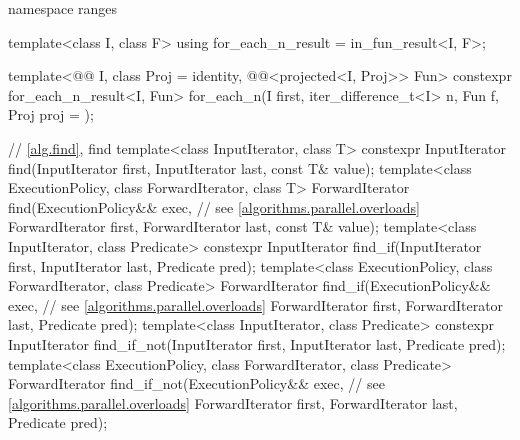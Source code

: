 \begin{codeblock}
{  namespace ranges {
    template<class I, class F>
      using for_each_n_result = in_fun_result<I, F>;

    template<@@ I, class Proj = identity,
             @@<projected<I, Proj>> Fun>
      constexpr for_each_n_result<I, Fun>
        for_each_n(I first, iter_difference_t<I> n, Fun f, Proj proj = {});
  }

  // \ref{alg.find}, find
  template<class InputIterator, class T>
    constexpr InputIterator find(InputIterator first, InputIterator last,
                                 const T& value);
  template<class ExecutionPolicy, class ForwardIterator, class T>
    ForwardIterator find(ExecutionPolicy&& exec,                // see \ref{algorithms.parallel.overloads}
                         ForwardIterator first, ForwardIterator last,
                         const T& value);
  template<class InputIterator, class Predicate>
    constexpr InputIterator find_if(InputIterator first, InputIterator last,
                                    Predicate pred);
  template<class ExecutionPolicy, class ForwardIterator, class Predicate>
    ForwardIterator find_if(ExecutionPolicy&& exec,             // see \ref{algorithms.parallel.overloads}
                            ForwardIterator first, ForwardIterator last,
                            Predicate pred);
  template<class InputIterator, class Predicate>
    constexpr InputIterator find_if_not(InputIterator first, InputIterator last,
                                        Predicate pred);
  template<class ExecutionPolicy, class ForwardIterator, class Predicate>
    ForwardIterator find_if_not(ExecutionPolicy&& exec,         // see \ref{algorithms.parallel.overloads}
                                ForwardIterator first, ForwardIterator last,
                                Predicate pred);

}
\end{codeblock}
